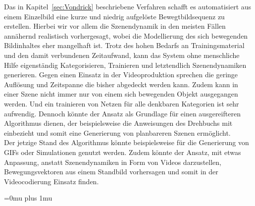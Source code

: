 \documentclass[times, 12pt,twocolumn]{article}
\begin{document}
 \label{sec:VondrickConclusion}
Das in Kapitel~\ref{sec:Vondrick} beschriebene Verfahren schafft es automatisiert aus einem Einzelbild eine kurze und niedrig aufgelöste Bewegtbildsequenz zu erstellen. Hierbei wir vor allem die Szenendynamik in den meisten Fällen annähernd realistisch vorhergesagt, wobei die Modellierung des sich bewegenden Bildinhaltes eher mangelhaft ist. Trotz des hohen Bedarfs an Trainingsmaterial und den damit verbundenen Zeitaufwand, kann das System ohne menschliche Hilfe eigenständig Kategorisieren, Trainieren und letztendlich Szenendynamiken generieren. Gegen einen Einsatz in der Videoproduktion sprechen die geringe Auflösung und Zeitspanne die bisher abgedeckt werden kann. Zudem kann in einer Szene nicht immer nur von einem sich bewegenden Objekt ausgegangen werden. Und ein trainieren von Netzen für alle denkbaren Kategorien ist sehr aufwendig. Dennoch könnte der Ansatz als Grundlage für einen ausgereifteren Algorithmus dienen, der beispielsweise die Anweisungen des Drehbuchs mit einbezieht und somit eine Generierung von planbareren Szenen ermöglicht. \\
Der jetzige Stand des Algorithmus könnte beispielsweise für die Generierung von GIFs oder Simulationen genutzt werden. Zudem könnte der Ansatz, mit etwas Anpassung, anstatt Szenendynamiken in Form von Videos darzustellen, Bewegungsvektoren aus einem Standbild vorhersagen und somit in der Videocodierung Einsatz finden. 




 \label{sec:Postroduktion}
 \label{sec:SOTAPostproduktion}

 \label{Zusammenfassung}




\Urlmuskip=0mu plus 1mu\relax %
 

\end{document}
